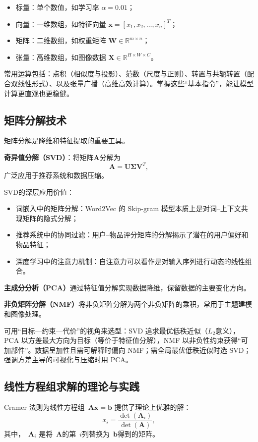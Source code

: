 \begin{itemize}
  \item 标量：单个数值，如学习率 $\alpha = 0.01$；
  \item 向量：一维数组，如特征向量 $\mathbf{x} = [x_1, x_2, \ldots, x_n]^T$；
  \item 矩阵：二维数组，如权重矩阵 $\mathbf{W} \in \mathbb{R}^{m \times n}$；
  \item 张量：高维数组，如图像数据 $\mathbf{X} \in \mathbb{R}^{H \times W \times C}$。
\end{itemize}

常用运算包括：点积（相似度与投影）、范数（尺度与正则）、转置与共轭转置（配合双线性形式）、以及张量广播（高维高效计算）。掌握这些“基本指令”，能让模型计算更直观也更稳健。

\subsection{矩阵分解技术}
矩阵分解是降维和特征提取的重要工具。

\textbf{奇异值分解（SVD）}：将矩阵$\mathbf{A}$分解为
$$
\mathbf{A} = \mathbf{U}\mathbf{\Sigma}\mathbf{V}^T,
$$
广泛应用于推荐系统和数据压缩。

SVD的深层应用价值：
\begin{itemize}
  \item 词嵌入中的矩阵分解：Word2Vec 的 Skip-gram 模型本质上是对词–上下文共现矩阵的隐式分解；
  \item 推荐系统中的协同过滤：用户–物品评分矩阵的分解揭示了潜在的用户偏好和物品特征；
  \item 深度学习中的注意力机制：自注意力可以看作是对输入序列进行动态的线性组合。
\end{itemize}

\textbf{主成分分析（PCA）}通过特征值分解实现数据降维，保留数据的主要变化方向。

\textbf{非负矩阵分解（NMF）}将非负矩阵分解为两个非负矩阵的乘积，常用于主题建模和图像处理。

可用“目标—约束—代价”的视角来选型：SVD 追求最优低秩近似（$L_2$意义），PCA 以方差最大方向为目标（等价于特征值分解），NMF 以非负性约束获得“可加部件”。数据呈加性且需可解释时偏向 NMF；需全局最优低秩近似时选 SVD；强调方差主导的可视化与压缩时用 PCA。

\subsection{线性方程组求解的理论与实践}

Cramer 法则为线性方程组~$\mathbf{A}\mathbf{x} = \mathbf{b}$ 提供了理论上优雅的解：
$$x_i = \frac{\det(\mathbf{A}_i)}{\det(\mathbf{A})}, $$
其中，~$\mathbf{A}_i$ 是将~$\mathbf{A}$的第~$i$列替换为~$\mathbf{b}$得到的矩阵。

